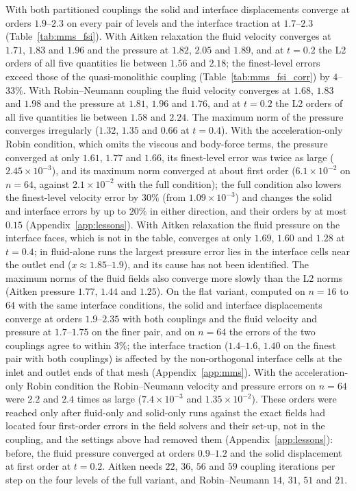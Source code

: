 With both partitioned couplings the solid and interface displacements converge at orders $1.9$--$2.3$ on every pair of levels and the interface traction at $1.7$--$2.3$ (Table~\ref{tab:mms_fsi}).
With Aitken relaxation the fluid velocity converges at $1.71$, $1.83$ and $1.96$ and the pressure at $1.82$, $2.05$ and $1.89$, and at $t = 0.2$ the L2 orders of all five quantities lie between $1.56$ and $2.18$; the finest-level errors exceed those of the quasi-monolithic coupling (Table~\ref{tab:mms_fsi_corr}) by $4$--$33\%$.
With Robin--Neumann coupling the fluid velocity converges at $1.68$, $1.83$ and $1.98$ and the pressure at $1.81$, $1.96$ and $1.76$, and at $t = 0.2$ the L2 orders of all five quantities lie between $1.58$ and $2.24$.
The maximum norm of the pressure converges irregularly ($1.32$, $1.35$ and $0.66$ at $t = 0.4$).
With the acceleration-only Robin condition, which omits the viscous and body-force terms, the pressure converged at only $1.61$, $1.77$ and $1.66$, its finest-level error was twice as large ($2.45\times10^{-3}$), and its maximum norm converged at about first order ($6.1\times10^{-2}$ on $n = 64$, against $2.1\times10^{-2}$ with the full condition); the full condition also lowers the finest-level velocity error by $30\%$ (from $1.09\times10^{-3}$) and changes the solid and interface errors by up to $20\%$ in either direction, and their orders by at most $0.15$ (Appendix~\ref{app:lessons}).
With Aitken relaxation the fluid pressure on the interface faces, which is not in the table, converges at only $1.69$, $1.60$ and $1.28$ at $t = 0.4$; in fluid-alone runs the largest pressure error lies in the interface cells near the outlet end ($x \approx 1.85$--$1.9$), and its cause has not been identified.
The maximum norms of the fluid fields also converge more slowly than the L2 norms (Aitken pressure $1.77$, $1.44$ and $1.25$).
On the flat variant, computed on $n = 16$ to $64$ with the same interface conditions, the solid and interface displacements converge at orders $1.9$--$2.35$ with both couplings and the fluid velocity and pressure at $1.7$--$1.75$ on the finer pair, and on $n = 64$ the errors of the two couplings agree to within $3\%$; the interface traction ($1.4$--$1.6$, $1.40$ on the finest pair with both couplings) is affected by the non-orthogonal interface cells at the inlet and outlet ends of that mesh (Appendix~\ref{app:mms}). With the acceleration-only Robin condition the Robin--Neumann velocity and pressure errors on $n = 64$ were $2.2$ and $2.4$ times as large ($7.4\times10^{-3}$ and $1.35\times10^{-2}$).
These orders were reached only after fluid-only and solid-only runs against the exact fields had located four first-order errors in the field solvers and their set-up, not in the coupling, and the settings above had removed them (Appendix~\ref{app:lessons}): before, the fluid pressure converged at orders $0.9$--$1.2$ and the solid displacement at first order at $t = 0.2$.
Aitken needs $22$, $36$, $56$ and $59$ coupling iterations per step on the four levels of the full variant, and Robin--Neumann $14$, $31$, $51$ and $21$.

